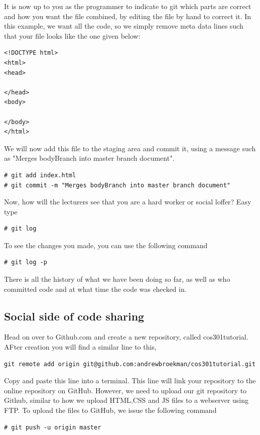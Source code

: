 \documentclass[a4paper,10pt]{article}
\begin{document}
It is now up to you as the programmer to indicate to git which parts are correct and how you want the file combined, by editing the file by hand to correct it. In this example, we want all the code, so we simply remove meta data lines such that your file looks like the one given below:
\begin{lstlisting}[style=HtmlStyle]
<!DOCTYPE html>
<html>
<head>

</head>
<body>

</body>
</html>
\end{lstlisting}

We will now add this file to the staging area and commit it, using a message such as "Merges bodyBranch into master branch document".
\begin{lstlisting}[style=TerminalStyle]
# git add index.html
# git commit -m "Merges bodyBranch into master branch document"
\end{lstlisting}

Now, how will the lecturers see that you are a hard worker or social loffer? Easy type 

\begin{lstlisting}[style=TerminalStyle]
# git log
\end{lstlisting}

To see the changes you made, you can use the following command
\begin{lstlisting}[style=TerminalStyle]
# git log -p
\end{lstlisting}

There is all the history of what we have been doing so far, as well as who committed code and at what time the code was checked in.

\subsection{Social side of code sharing}
Head on over to Github.com and create a new repository, called cos301tutorial. AFter creation you will find a similar line to this,

\begin{lstlisting}[style=OutputStyle]
git remote add origin git@github.com:andrewbroekman/cos301tutorial.git
\end{lstlisting}

Copy and paste this line into a terminal. This line will link your repository to the online repository on GitHub. However, we need to upload our git repository to Github, similar to how we upload HTML,CSS and JS files to a webserver using FTP. To upload the files to GitHub, we issue the following command
\begin{lstlisting}[style=TerminalStyle]
# git push -u origin master
\end{lstlisting}
\end{document}
